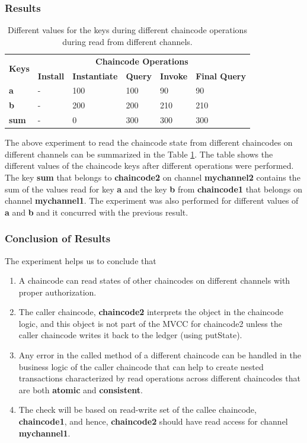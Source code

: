 \documentclass[
  a4paper,  %
  twoside,  %
  bibliography=totoc,
  headsepline,
  cleardoublepage=empty,
  parskip=half,
  draft=false
]{scrbook}
\begin{document}
\subsubsection{Results}
\begin{table}[h!]
\begin{center}
    \begin{tabular}{ |l|l|l|l|l|l|}
    \hline
    \multirow{2}{*}{\textbf{Keys}} & \multicolumn{5}{c|}{\textbf{Chaincode Operations}}\\ \cline{2-6}
    &\textbf{Install}& \textbf{Instantiate}& \textbf{Query}& \textbf{Invoke}& \textbf{Final Query} \\ \hline
    \textbf{a} & - & 100 & 100 & 90 & 90 \\ \hline
    \textbf{b} & - & 200 & 200 & 210 & 210 \\ \hline
    \textbf{sum} & - & 0 & 300 & 300 & 300 \\ \hline
    \end{tabular}
\end{center}
\caption{Different values for the keys during different chaincode operations during read from different channels.}
    \label{tab:result12}
\end{table}
The above experiment to read the chaincode state from different chaincodes on different channels can be summarized in the Table \ref{tab:result12}. The table shows the different values of the chaincode keys after different operations were performed. The key \textbf{sum} that belongs to \textbf{chaincode2} on channel \textbf{mychannel2} contains the sum of the values read for key \textbf{a} and the key \textbf{b} from \textbf{chaincode1} that belongs on channel \textbf{mychannel1}. The experiment was also performed for different values of \textbf{a} and \textbf{b} and it concurred with the previous result.

\subsubsection{Conclusion of Results}
The experiment helps us to conclude that 
\begin{enumerate}
    \item A chaincode can read states of other chaincodes on different channels with proper authorization.
    \item The caller chaincode, \textbf{chaincode2} interprets the object in the chaincode logic, and this object is not part of the MVCC for chaincode2 unless the caller chaincode writes it back to the ledger (using putState). 
    \item Any error in the called method of a different chaincode can be handled in the business logic of the caller chaincode that can help to create nested transactions characterized by read operations across different chaincodes that are both \textbf{atomic} and \textbf{consistent}.
    \item The check will be based on read-write set of the callee chaincode, \textbf{chaincode1}, and hence, \textbf{chaincode2} should have read access for channel \textbf{mychannel1}.  
\end{enumerate} 
\end{document}
